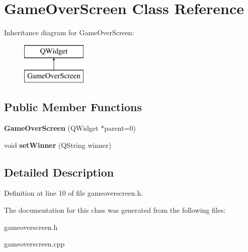 \hypertarget{class_game_over_screen}{\section{Game\-Over\-Screen Class Reference}
\label{class_game_over_screen}
}
Inheritance diagram for Game\-Over\-Screen\-:\begin{figure}[H]
\begin{center}
\leavevmode
\includegraphics[height=2.000000cm]{class_game_over_screen}
\end{center}
\end{figure}
\subsection*{Public Member Functions}
\begin{DoxyCompactItemize}
\item 
\hypertarget{class_game_over_screen_af87dfa0db651123e3a77265b5c66da13}{{\bfseries Game\-Over\-Screen} (Q\-Widget $\ast$parent=0)}\label{class_game_over_screen_af87dfa0db651123e3a77265b5c66da13}

\item 
\hypertarget{class_game_over_screen_a9767d775fcb476810e1d3690e631aa62}{void {\bfseries set\-Winner} (Q\-String winner)}\label{class_game_over_screen_a9767d775fcb476810e1d3690e631aa62}

\end{DoxyCompactItemize}


\subsection{Detailed Description}


Definition at line 10 of file gameoverscreen.\-h.



The documentation for this class was generated from the following files\-:\begin{DoxyCompactItemize}
\item 
gameoverscreen.\-h\item 
gameoverscreen.\-cpp\end{DoxyCompactItemize}
